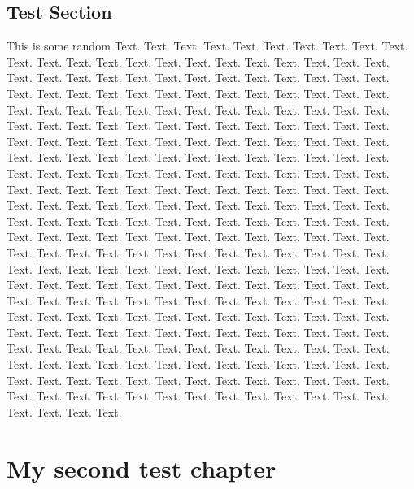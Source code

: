 \documentclass{book}
\begin{document}
\section{Test Section}
This is some random Text. Text. Text. Text. Text. Text. Text. Text. Text. Text. Text. Text. Text. Text. Text. Text. Text. Text. Text. Text. Text. Text. Text. Text. Text. Text. Text. Text. Text. Text. Text. Text. Text. Text. Text. Text. Text. Text. Text. Text. Text. Text. Text. Text. Text. Text. Text. Text. Text. Text. Text. Text. Text. Text. Text. Text. Text. Text. Text. Text. Text. Text. Text. Text. Text. Text. Text. Text. Text. Text. Text. Text. Text. Text. Text. Text. Text. Text. Text. Text. Text. Text. Text. Text. Text. Text. Text. Text. Text. Text. Text. Text. Text. Text. Text. Text. Text. Text. Text. Text. Text. Text. Text. Text. Text. Text. Text. Text. Text. Text. Text. Text. Text. Text. Text. Text. Text. Text. Text. Text. Text. Text. Text. Text. Text. Text. Text. Text. Text. Text. Text. Text. Text. Text. Text. Text. Text. Text. Text. Text. Text. Text. Text. Text. Text. Text. Text. Text. Text. Text. Text. Text. Text. Text. Text. Text. Text. Text. Text. Text. Text. Text. Text. Text. Text. Text. Text. Text. Text. Text. Text. Text. Text. Text. Text. Text. Text. Text. Text. Text. Text. Text. Text. Text. Text. Text. Text. Text. Text. Text. Text. Text. Text. Text. Text. Text. Text. Text. Text. Text. Text. Text. Text. Text. Text. Text. Text. Text. Text. Text. Text. Text. Text. Text. Text. Text. Text. Text. Text. Text. Text. Text. Text. Text. Text. Text. Text. Text. Text. Text. Text. Text. Text. Text. Text. Text. Text. Text. Text. Text. Text. Text. Text. Text. Text. Text. Text. Text. Text. Text. Text. Text. Text. Text. Text. Text. Text. Text. Text. Text. Text. Text. Text. Text. Text. Text. Text. Text. Text. Text. Text. Text. Text. Text. Text. Text. Text. Text. Text. Text. Text. Text. Text. Text. Text. Text. Text. Text. Text. Text. Text. Text. Text. Text. Text. Text. Text. Text. Text. Text.

\chapter{My second test chapter}
\end{document}
